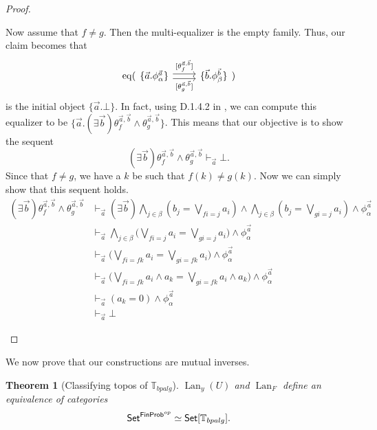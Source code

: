 \documentclass[a4paper]{amsproc}
\theoremstyle{plain}
\newtheorem{theorem}{Theorem}[section]
\theoremstyle{definition}
\theoremstyle{remark}
\numberwithin{equation}{section}
\newcommand{\y}{\textit{y}}
\DeclareMathOperator{\Lan}{Lan}
\DeclareMathOperator{\eq}{eq}
\newcommand{\Set}{\textup{\textsf{Set}}}
\newcommand{\FinProb}{\textup{\textsf{FinProb}}}
\begin{document}
\begin{proof}
\begin{enumerate}
        Now assume that $f \neq g$. Then the multi-equalizer is the empty family. Thus, our claim becomes that
        \[
            \eq(\begin{tikzcd}
                \{ \vec{a}.\phi^{\vec{a}}_{\alpha} \} \arrow[r, "{[\theta^{\vec{a},\vec{b}}_f]}", shift left] \arrow[r, "{[\theta^{\vec{a},\vec{b}}_g]}"', shift right] & \{ \vec{b}.\phi^{\vec{b}}_{\beta} \}
                \end{tikzcd})
        \]
        is the initial object $\{\vec{a}.\bot\}$. In fact, using D.1.4.2 in \cite{johnstone2002sketches2}, we can compute this equalizer to be $\{ \vec{a} . (\exists \vec{b}) \theta_f^{\vec{a},\vec{b}} \wedge \theta_g^{\vec{a},\vec{b}} \}$. This means that our objective is to show the sequent
        \[
            (\exists \vec{b}) \theta_f^{\vec{a},\vec{b}} \wedge \theta_g^{\vec{a},\vec{b}} \vdash_{\vec{a}} \bot .
        \]
        Since that $f \neq g$, we have a $k$ be such that $f(k) \neq g(k)$. Now we can simply show that this sequent holds.
        \begin{align*}
            (\exists \vec{b}) \theta_f^{\vec{a},\vec{b}} \wedge \theta_g^{\vec{a},\vec{b}}
            &\vdash_{\vec{a}} (\exists \vec{b}) \bigwedge_{j \in \beta} (b_j = \bigvee_{f i = j} a_i) \wedge \bigwedge_{j \in \beta} (b_j = \bigvee_{g i = j} a_i) \wedge \phi_{\alpha}^{\vec{a}} \\
            &\vdash_{\vec{a}} \bigwedge_{j \in \beta} \big ( \bigvee_{f i = j} a_i = \bigvee_{g i = j} a_i \big ) \wedge \phi_{\alpha}^{\vec{a}} \\
            &\vdash_{\vec{a}} \big ( \bigvee_{f i = f k} a_i = \bigvee_{g i = f k} a_i \big ) \wedge \phi_{\alpha}^{\vec{a}} \\
            &\vdash_{\vec{a}} \big ( \bigvee_{f i = f k} a_i \wedge a_k = \bigvee_{g i = f k} a_i \wedge a_k \big ) \wedge \phi_{\alpha}^{\vec{a}}\\
            &\vdash_{\vec{a}} (a_k = 0) \wedge \phi_{\alpha}^{\vec{a}} \\
            &\vdash_{\vec{a}} \bot
        \end{align*}
    \end{enumerate}
\end{proof}

We now prove that our constructions are mutual inverses.

\begin{theorem}[Classifying topos of $\mathbb{T}_{bpalg}$] \label{classifying_presheaf}
$\Lan_{\y}(U)$ and $\Lan_F$ define an equivalence of categories
\[
\Set^{\FinProb^{op}} \simeq \Set[\mathbb{T}_{bpalg}].
\]
\end{theorem}
\end{document}
